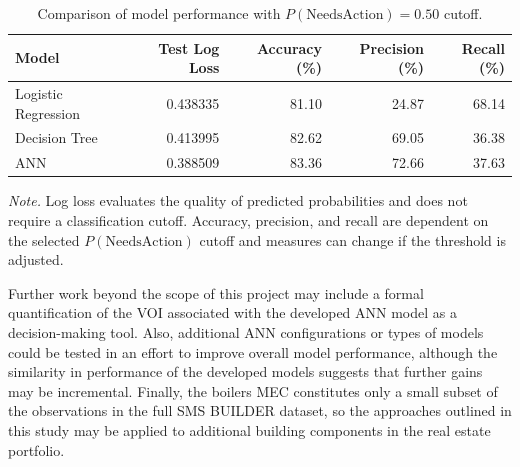 \documentclass[NewProceedings,letterpaper,NoPageNumbers,NoLineNumbers, DoubleSpace]{ascelike-new}
\begin{document}
\begin{table}[htbp]
    \centering
    \caption{Comparison of model performance with $P(\mathrm{NeedsAction}) = 0.50$ cutoff.}
    \label{tab:model_comparison}
    \begin{tabular}{lrrrr}
        \toprule
        Model & Test Log Loss & Accuracy (\%) & Precision (\%) & Recall (\%) \\
        \midrule
        Logistic Regression & 0.438335 & 81.10 & 24.87 & 68.14 \\
        Decision Tree       & 0.413995 & 82.62 & 69.05 & 36.38 \\
        ANN                 & 0.388509 & 83.36 & 72.66 & 37.63 \\
        \bottomrule
    \end{tabular}

    \vspace{0.5em}
    \parbox{0.9\linewidth}{\footnotesize
    \textit{Note.} Log loss evaluates the quality of predicted probabilities and does not require a classification cutoff. Accuracy, precision, and recall are dependent on the selected $P(\mathrm{NeedsAction})$ cutoff and measures can change if the threshold is adjusted.}
\end{table}

Further work beyond the scope of this project may include a formal quantification of the VOI associated with the developed ANN model as a decision-making tool. Also, additional ANN configurations or types of models could be tested in an effort to improve overall model performance, although the similarity in performance of the developed models suggests that further gains may be incremental. Finally, the boilers MEC constitutes only a small subset of the observations in the full SMS BUILDER dataset, so the approaches outlined in this study may be applied to additional building components in the real estate portfolio.

\FloatBarrier

\label{section:references}

\end{document}
